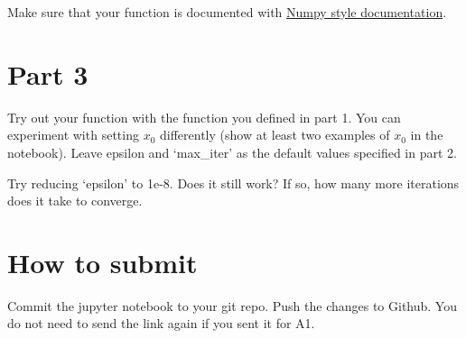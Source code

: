 \documentclass{article}
\begin{document}
Make sure that your function is documented with \href{https://numpydoc.readthedocs.io/en/latest/format.html}{Numpy style documentation}.

\section*{Part 3}

Try out your function with the function you defined in part 1. You can experiment with setting $x_0$ differently (show at least two examples of $x_0$ in the notebook). Leave epsilon and `max\_iter' as the default values specified in part 2.

Try reducing `epsilon' to 1e-8. Does it still work? If so, how many more iterations does it take to converge.

\section*{How to submit}

Commit the jupyter notebook to your git repo. Push the changes to Github. You do not need to send the link again if you sent it for A1.
\end{document}
